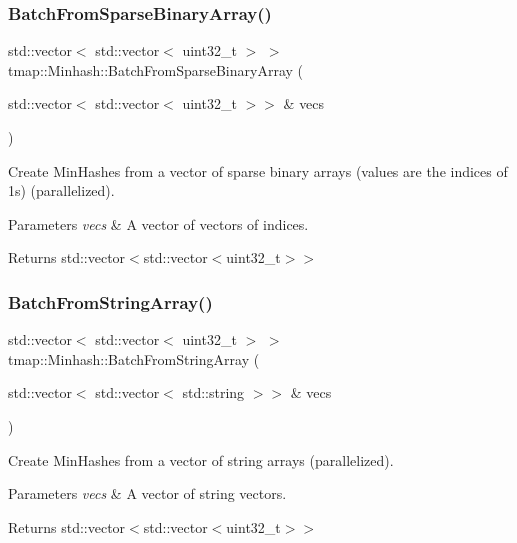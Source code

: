 \subsubsection{\texorpdfstring{Batch\+From\+Sparse\+Binary\+Array()}{BatchFromSparseBinaryArray()}}
{\footnotesize\ttfamily std\+::vector$<$ std\+::vector$<$ uint32\+\_\+t $>$ $>$ tmap\+::\+Minhash\+::\+Batch\+From\+Sparse\+Binary\+Array (\begin{DoxyParamCaption}\item[{std\+::vector$<$ std\+::vector$<$ uint32\+\_\+t $>$$>$ \&}]{vecs }\end{DoxyParamCaption})}



Create Min\+Hashes from a vector of sparse binary arrays (values are the indices of 1s) (parallelized). 


\begin{DoxyParams}{Parameters}
{\em vecs} & A vector of vectors of indices. \\
\hline
\end{DoxyParams}
\begin{DoxyReturn}{Returns}
std\+::vector$<$std\+::vector$<$uint32\+\_\+t$>$$>$ 
\end{DoxyReturn}
\mbox{\label{classtmap_1_1Minhash_a9382e443b9f622c4564449373051d006}} 
\subsubsection{\texorpdfstring{Batch\+From\+String\+Array()}{BatchFromStringArray()}}
{\footnotesize\ttfamily std\+::vector$<$ std\+::vector$<$ uint32\+\_\+t $>$ $>$ tmap\+::\+Minhash\+::\+Batch\+From\+String\+Array (\begin{DoxyParamCaption}\item[{std\+::vector$<$ std\+::vector$<$ std\+::string $>$$>$ \&}]{vecs }\end{DoxyParamCaption})}



Create Min\+Hashes from a vector of string arrays (parallelized). 


\begin{DoxyParams}{Parameters}
{\em vecs} & A vector of string vectors. \\
\hline
\end{DoxyParams}
\begin{DoxyReturn}{Returns}
std\+::vector$<$std\+::vector$<$uint32\+\_\+t$>$$>$ 
\end{DoxyReturn}
\mbox{\label{classtmap_1_1Minhash_a8fe5c588003e8a3089d0a04df7b0f6e9}} 
